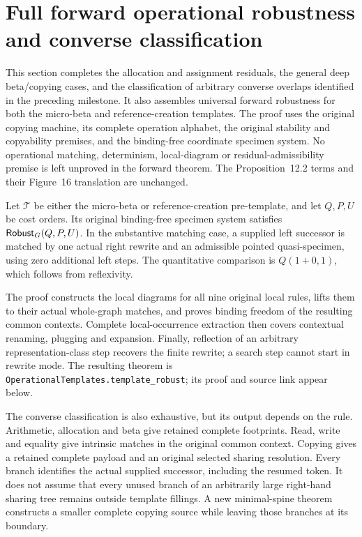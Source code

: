 \clearpage
\section{Full forward operational robustness and converse classification}
\label{sec:copying-operational-forward-robustness}
This section completes the allocation and assignment residuals, the general
deep beta/copying cases, and the classification of arbitrary converse overlaps
identified in the preceding milestone. It also assembles universal forward
robustness for both the micro-beta and reference-creation templates. The proof
uses the original copying machine, its complete operation alphabet, the
original stability and copyability premises, and the binding-free coordinate
specimen system. No operational matching, determinism, local-diagram or
residual-admissibility premise is left unproved in the forward theorem.
The Proposition~12.2 terms and their Figure~16 translation are unchanged.

\begin{theorem}
Let $\mathcal T$ be either the micro-beta or reference-creation pre-template,
and let $Q,P,U$ be cost orders. Its original binding-free specimen system
satisfies $\mathsf{Robust}_G(Q,P,U)$. In the substantive matching case, a supplied
left successor is matched by one actual right rewrite and an admissible
pointed quasi-specimen, using zero additional left steps. The quantitative
comparison is $Q(1+0,1)$, which follows from reflexivity.
\end{theorem}
The proof constructs the local diagrams for all nine original local rules,
lifts them to their actual whole-graph matches, and proves binding freedom
of the resulting common contexts. Complete local-occurrence extraction then
covers contextual renaming, plugging and expansion. Finally, reflection of
an arbitrary representation-class step recovers the finite rewrite; a search
step cannot start in rewrite mode. The resulting theorem is
\texttt{OperationalTemplates.template\_robust}; its proof and source link
appear below.

The converse classification is also exhaustive, but its output depends on
the rule. Arithmetic, allocation and beta give retained complete footprints.
Read, write and equality give intrinsic matches in the original common
context. Copying gives a retained complete payload and an original selected
sharing resolution. Every branch identifies the actual supplied successor,
including the resumed token. It does not assume that every unused branch of
an arbitrarily large right-hand sharing tree remains outside template
fillings. A new minimal-spine theorem constructs a smaller complete copying
source while leaving those branches at its boundary.

